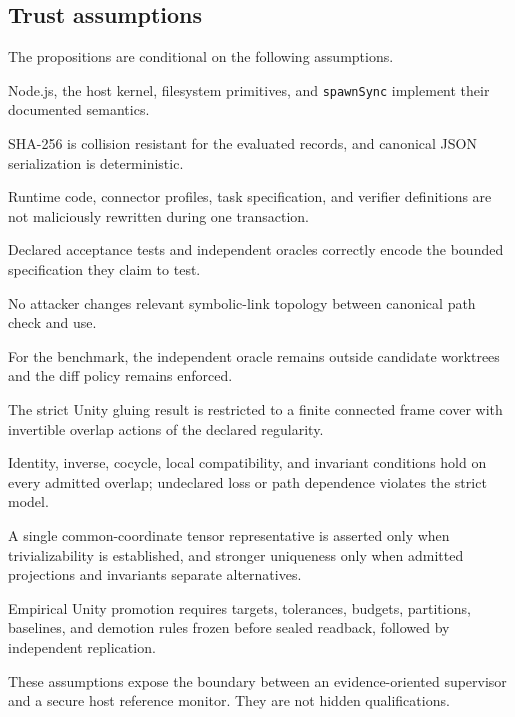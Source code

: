 \documentclass[10pt,twocolumn]{article}
\theoremstyle{definition}
\theoremstyle{plain}
\theoremstyle{remark}
\newcommand{\file}[1]{\nolinkurl{#1}}
\begin{document}
\subsection{Trust assumptions}
\label{sec:assumptions}

The propositions are conditional on the following assumptions.

\begin{description}[style=nextline,leftmargin=2.5em,font=\normalfont\bfseries]
\item[A1] Node.js, the host kernel, filesystem primitives, and \file{spawnSync} implement their documented semantics.
\item[A2] SHA-256 is collision resistant for the evaluated records, and canonical JSON serialization is deterministic.
\item[A3] Runtime code, connector profiles, task specification, and verifier definitions are not maliciously rewritten during one transaction.
\item[A4] Declared acceptance tests and independent oracles correctly encode the bounded specification they claim to test.
\item[A5] No attacker changes relevant symbolic-link topology between canonical path check and use.
\item[A6] For the benchmark, the independent oracle remains outside candidate worktrees and the diff policy remains enforced.
\item[A7] The strict Unity gluing result is restricted to a finite connected frame cover with invertible overlap actions of the declared regularity.
\item[A8] Identity, inverse, cocycle, local compatibility, and invariant conditions hold on every admitted overlap; undeclared loss or path dependence violates the strict model.
\item[A9] A single common-coordinate tensor representative is asserted only when trivializability is established, and stronger uniqueness only when admitted projections and invariants separate alternatives.
\item[A10] Empirical Unity promotion requires targets, tolerances, budgets, partitions, baselines, and demotion rules frozen before sealed readback, followed by independent replication.
\end{description}

These assumptions expose the boundary between an evidence-oriented supervisor and a secure host reference monitor.  They are not hidden qualifications.
\end{document}
